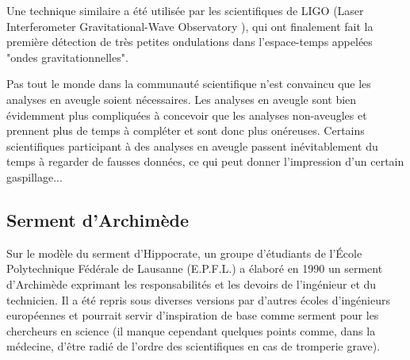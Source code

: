 	Une technique similaire a été utilisée par les scientifiques de LIGO (Laser Interferometer Gravitational-Wave Observatory ), qui ont finalement fait la première détection de très petites ondulations dans l'espace-temps appelées "ondes gravitationnelles".

	Pas tout le monde dans la communauté scientifique n'est convaincu que les analyses en aveugle soient nécessaires. Les analyses en aveugle sont bien évidemment plus compliquées à concevoir que les analyses non-aveugles et prennent plus de temps à compléter et sont donc plus onéreuses. Certains scientifiques participant à des analyses en aveugle passent inévitablement du temps à regarder de fausses données, ce qui peut donner l'impression d'un certain gaspillage...
	
	\pagebreak
	\subsection{Serment d'Archimède}
	Sur le modèle du serment d'Hippocrate, un groupe d'étudiants de l'École Polytechnique Fédérale de Lausanne (E.P.F.L.) a élaboré en 1990 un serment d'Archimède exprimant les responsabilités et les devoirs de l'ingénieur et du technicien. Il a été repris sous diverses versions par d'autres écoles d'ingénieurs européennes et pourrait servir d'inspiration de base comme serment pour les chercheurs en science (il manque cependant quelques points comme, dans la médecine, d'être radié de l'ordre des scientifiques en cas de tromperie grave).

